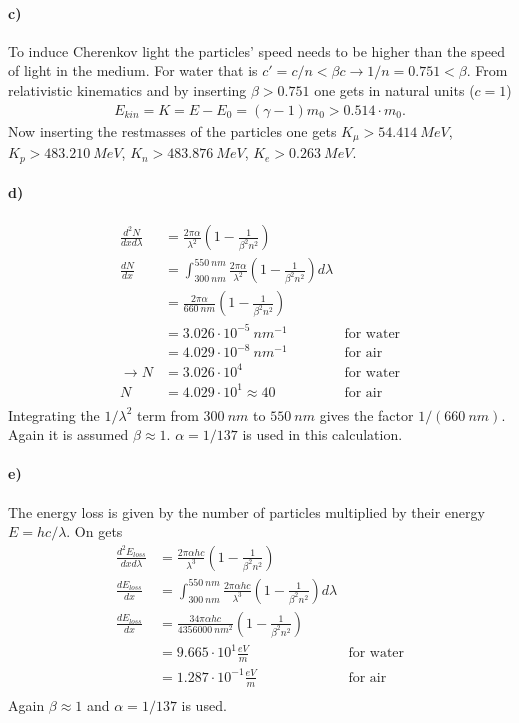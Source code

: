 \documentclass{article}
\begin{document}
\paragraph{c)}
To induce Cherenkov light the particles' speed needs to be higher than the speed of light in the medium. For water that is $c' = c/n < \beta c \rightarrow 1/n = 0.751 < \beta$.
From relativistic kinematics and by inserting $\beta > 0.751$ one gets in natural units ($c=1$)
\begin{align*}
E_{kin} = K = E - E_0 = (\gamma - 1) m_0 > 0.514 \cdot m_0.
\end{align*}
Now inserting the restmasses of the particles one gets $K_\mu > 54.414\ MeV$, $K_p > 483.210\ MeV$, $K_n > 483.876\ MeV$, $K_e > 0.263\ MeV$.

\paragraph{d)}
\begin{align*}
\frac{d^2N}{dxd\lambda} &= \frac{2\pi\alpha}{\lambda^2}\left(1 - \frac{1}{\beta^2n^2}\right)\\
\frac{dN}{dx} &= \int_{300\ nm}^{550\ nm} \frac{2\pi\alpha}{\lambda^2}\left(1 - \frac{1}{\beta^2n^2}\right) d\lambda \\
&= \frac{2\pi\alpha}{660\ nm}\left(1 - \frac{1}{\beta^2n^2}\right)\\
&= 3.026 \cdot 10^{-5}\ nm^{-1} &\text{for water}\\
&= 4.029 \cdot 10^{-8}\ nm^{-1} &\text{for air}\\
\rightarrow N &= 3.026 \cdot 10^4 &\text{for water}\\
N &= 4.029 \cdot 10^1 \approx 40 &\text{for air}\\
\end{align*}
Integrating the $1/\lambda^2$ term from $300\ nm$ to $550\ nm$ gives the factor $1 / (660\ nm)$. Again it is assumed $\beta \approx 1$. $\alpha = 1/137$ is used in this calculation.

\paragraph{e)}
The energy loss is given by the number of particles multiplied by their energy $E=hc/\lambda$. On gets
\begin{align*}
\frac{d^2E_{loss}}{dxd\lambda} &= \frac{2 \pi \alpha h c}{\lambda^3} \left(1 - \frac{1}{\beta^2n^2}\right)\\
\frac{dE_{loss}}{dx} &= \int_{300\ nm}^{550\ nm} \frac{2 \pi \alpha h c}{\lambda^3} \left(1 - \frac{1}{\beta^2n^2}\right) d\lambda \\
\frac{dE_{loss}}{dx} &= \frac{34 \pi \alpha h c}{4356000\ nm^2} \left(1 - \frac{1}{\beta^2n^2}\right)\\
&= 9.665 \cdot 10^{1} \frac{eV}{m} &\text{for water}\\
&= 1.287 \cdot 10^{-1} \frac{eV}{m} &\text{for air}\\
\end{align*}
Again $\beta \approx 1$ and $\alpha = 1 / 137$ is used.
\end{document}
